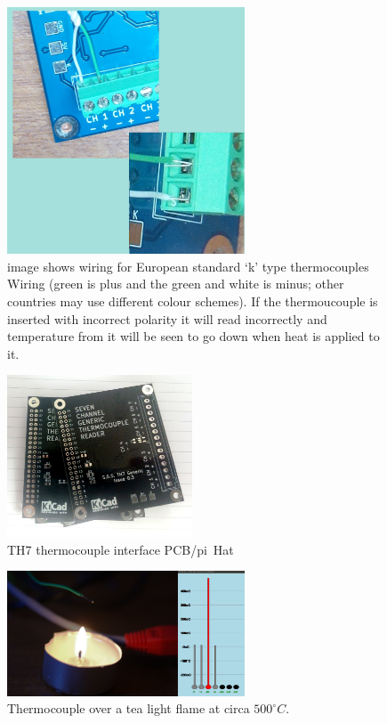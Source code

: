 \documentclass[10pt,foldmark]{leaflet}
\begin{document}
\begin{figure}[h]
 \centering
 \includegraphics[width=200pt]{./wiring.jpg}
 \caption{image shows wiring for European standard `k' type thermocouples Wiring (green is plus and the green and white is minus; other countries may use different colour schemes). 
 If the thermoucouple is inserted with incorrect polarity it will read incorrectly and temperature from it will be seen to go down when heat is applied to it.}
 \label{fig:con}
\end{figure}

\begin{figure}[h]
 \centering
 \includegraphics[width=156pt]{./TH7_0p3.jpg}
 \caption{TH7 thermocouple interface PCB/pi~Hat}
 \label{fig:th7_2}
\end{figure}

\clearpage
\begin{figure}[ht]
 \centering
 \includegraphics[width=200pt]{TH7_tea_light.jpg}
 \caption{Thermocouple over a tea light flame at circa ${500}^{\circ} C$.}
 \label{fig:pi}
\end{figure}
\mbox{}
\vfill
\end{document}
